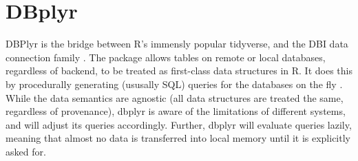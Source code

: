 \section{DBplyr}

DBPlyr is the bridge between R’s immensly popular tidyverse, and the DBI data
connection family \cite{tidy-dplyr}. The package allows tables on remote or
local databases, regardless of backend, to be treated as first-class data
structures in R. It does this by procedurally generating (ususally SQL) queries
for the databases on the fly \cite{hid-sp18-403-R--dbplyr}. While the data
semantics are agnostic (all data structures are treated the same, regardless of
provenance), dbplyr is aware of the limitations of different systems, and will
adjust its queries accordingly. Further, dbplyr will evaluate queries lazily,
meaning that almost no data is transferred into local memory until it is
explicitly asked for.
